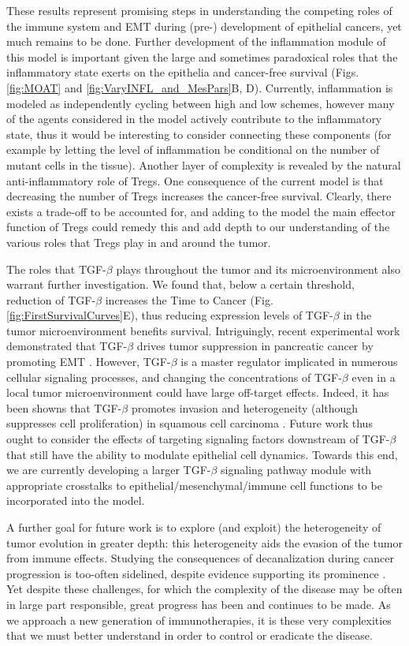 \documentclass[11pt]{article}
\begin{document}
These results represent promising steps in understanding the competing roles of the immune system and EMT during (pre-) development of epithelial cancers, yet much remains to be done. Further development of the inflammation module of this model is important given the large and sometimes paradoxical roles that the inflammatory state exerts on the epithelia and cancer-free survival (Figs. \ref{fig:MOAT} and \ref{fig:VaryINFL_and_MesPars}B, D). Currently, inflammation is modeled as independently cycling between high and low schemes, however many of the agents considered in the model actively contribute to the inflammatory state, thus it would be interesting to consider connecting these components (for example by letting the level of inflammation be conditional on the number of mutant cells in the tissue). Another layer of complexity is revealed by the natural anti-inflammatory role of Tregs. One consequence of the current model is that decreasing the number of Tregs increases the cancer-free survival. Clearly, there exists a trade-off to be accounted for, and adding to the model the main effector function of Tregs could remedy this and add depth to our understanding of the various roles that Tregs play in and around the tumor.
\par
The roles that TGF-$\beta$ plays throughout the tumor and its microenvironment also warrant further investigation. We found that, below a certain threshold, reduction of TGF-$\beta$ increases the Time to Cancer  (Fig. \ref{fig:FirstSurvivalCurves}E), thus reducing expression levels of TGF-$\beta$ in the tumor microenvironment benefits survival. Intriguingly, recent experimental work demonstrated that TGF-$\beta$ drives tumor suppression in pancreatic cancer by promoting EMT \cite{david16_tgfv}. However, TGF-$\beta$ is a master regulator implicated in numerous cellular signaling processes, and changing the concentrations of TGF-$\beta$ even in a local tumor microenvironment could have large off-target effects. Indeed, it has been showns that TGF-$\beta$ promotes invasion and heterogeneity (although suppresses cell proliferation) in squamous cell carcinoma \cite{oshimori15_tgfv}. Future work thus ought to consider the effects of targeting signaling factors downstream of TGF-$\beta$ that still have the ability to modulate epithelial cell dynamics. Towards this end, we are currently developing a larger TGF-$\beta$ signaling pathway module with appropriate crosstalks to  epithelial/mesenchymal/immune cell functions to be incorporated into the model.
\par
A further goal for future work is to explore (and exploit) the heterogeneity of tumor evolution in greater depth: this heterogeneity aids the evasion of the tumor from immune effects. Studying the consequences of decanalization \cite{gibson09_decanalization} during cancer progression is too-often sidelined, despite evidence supporting its prominence \cite{cyll17_tumour, punt17_tumour, dagogo-jack18_tumour}. Yet despite these challenges, for which the complexity of the disease may be often in large part responsible, great progress has been and continues to be made. As we approach a new generation of immunotherapies, it is these very complexities that we must better understand in order to control or eradicate the disease.
\end{document}
